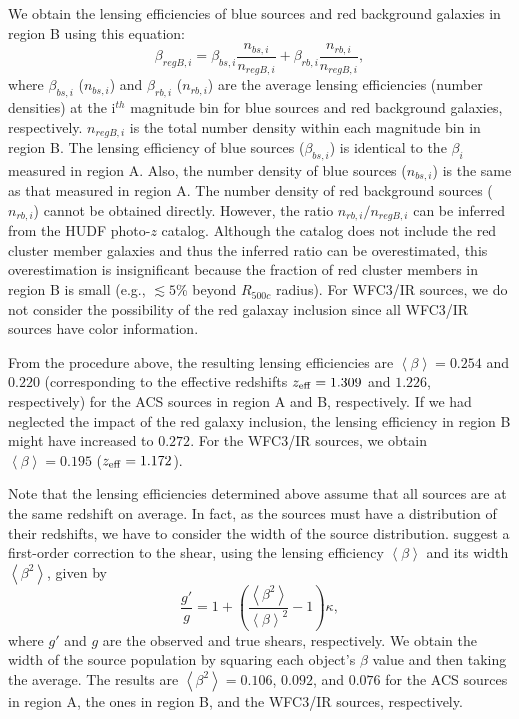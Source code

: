 \documentclass[twocolumn]{aastex631}
\begin{document}
We obtain the lensing efficiencies of blue sources and red background galaxies in region B using this equation: 
\begin{equation}
\beta_{regB,i} = \beta_{bs,i}\frac{n_{bs,i}} {n_{regB,i}} + \beta_{rb,i}\frac{n_{rb,i}} {n_{regB,i}} , \label{eqn_beta_regB}
\end{equation}
\noindent 
where $\beta_{bs,i}$ ($n_{bs,i}$) and $\beta_{rb,i}$ ($n_{rb,i}$) are the average lensing efficiencies (number densities) at the i$^{th}$ magnitude bin for blue sources and red background galaxies, respectively. $n_{regB,i}$ is the total number density within each magnitude bin in region B. 
The lensing efficiency of blue sources ($\beta_{bs,i}$) is identical to the $\beta_i$ measured in region A. Also, the number density of blue sources ($n_{bs,i}$) is the same as that measured in region A. 
The number density of red background sources ($n_{rb,i}$) cannot be obtained directly. However, the ratio $n_{rb,i}/n_{regB,i}$ can be inferred from the HUDF photo-$z$ catalog. 
Although the catalog does not include the red cluster member galaxies and thus the inferred ratio can be overestimated, this overestimation is insignificant because the fraction of red cluster members in region B is small (e.g., $\lesssim 5$\% beyond $R_{500c}$ radius). 
For WFC3/IR sources, we do not consider the possibility of the red galaxay inclusion since all WFC3/IR sources have color information.


From the procedure above, the resulting lensing efficiencies are $\left < \beta \right > =0.254$ and $0.220$ (corresponding to the effective redshifts $z_{\rm eff}=1.309$ and $1.226$, respectively) for the ACS sources in region A and B, respectively. 
If we had neglected the impact of the red galaxy inclusion, the lensing efficiency in region B might have increased to $0.272$. 
For the WFC3/IR sources, we obtain $\left < \beta \right >=0.195$ ($z_{\rm eff}=1.172$).


Note that the lensing efficiencies determined above assume that all sources are at the same redshift on average. 
In fact, as the sources must have a distribution of their redshifts, we have to consider the width of the source distribution. \cite{Seitz1997} suggest a first-order correction to the shear, using the lensing efficiency $\left < \beta \right >$ and its width $\left < \beta^{2} \right >$, given by 
\begin{equation}
\frac{g\prime}{g} = 1 + \left
(\frac{\left < \beta^{2} \right >}{\left<\beta\right>^{2}} - 1 \right )\kappa, 
\end{equation}
\noindent
where $g\prime$ and $g$ are the observed and true shears, respectively. 
We obtain the width of the source population by squaring each object's $\beta$ value and then taking the average. The results are $\left < \beta^{2} \right >=0.106$, $0.092$, and $0.076$ for the ACS sources in region A, the ones in region B, and the WFC3/IR sources, respectively. 
\end{document}
